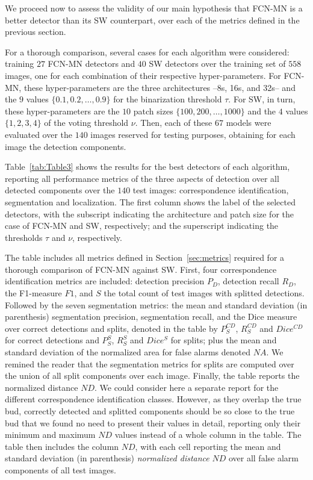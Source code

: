 \documentclass[a4paper,authoryear,review]{elsarticle}
\begin{document}
	We proceed now to assess the validity of our main hypothesis that FCN-MN is a better detector than its SW counterpart, over each of the metrics defined in the previous section. 
	
	For a thorough comparison, several cases for each algorithm  were considered: training $27$ FCN-MN detectors and $40$ SW detectors over the training set of $558$ images, one for each combination of their respective hyper-parameters. For FCN-MN, these hyper-parameters are the three architectures --8s, 16s, and 32s-- and the $9$ values $\{0.1, 0.2, \ldots, 0.9\}$ for the binarization threshold $\tau$. For SW, in turn, these hyper-parameters are the $10$ patch sizes $\{100, 200, \ldots, 1000\}$  and the $4$ values $\{1, 2, 3, 4\}$ of the voting threshold $\nu$. Then, each of these $67$ models were evaluated over the $140$ images reserved for testing purposes, obtaining for each image the detection components.
	
	Table~\ref{tab:Table3} shows the results for the best detectors of each algorithm, reporting all performance metrics of the three aspects of detection over all detected components over the $140$ test images: correspondence identification, segmentation and localization. The first column shows the label of the selected detectors, with the subscript indicating the architecture and patch size for the case of FCN-MN and SW, respectively; and the superscript indicating the thresholds $\tau$ and $\nu$, respectively.
	
	The table includes all metrics defined in Section~\ref{sec:metrics} required for a thorough comparison of FCN-MN against SW. First, four correspondence identification metrics are included: detection precision $P_D$, detection recall $R_D$, the F1-measure  $F1$, and $S$ the total count of test images with splitted detections. Followed by the seven segmentation metrics: the mean and standard deviation (in parenthesis) segmentation precision, segmentation recall, and the Dice measure over correct detections and splits, denoted in the table by $P_S^{CD}$, $R_S^{CD}$ and $Dice^{CD}$ for correct detections and $P_S^S$, $R_S^S$ and $Dice^S$ for splits; plus the mean and standard deviation of the normalized area for false alarms denoted $NA$. We remined the reader that the segmentation metrics for splits are computed over the union of all split components over each image. 
	Finally, the table reports the normalized distance $ND$. We could consider here a separate report for the different correspondence identification classes. However, as they overlap the true bud, correctly detected and splitted components should be so close to the true bud that we found no need to present their values in detail, reporting only their minimum and maximum $ND$ values instead of a whole column in the table. The table then includes the column $ND$, with each cell reporting the mean and standard deviation (in parenthesis) \emph{normalized distance} $ND$ over all false alarm components of all test images. 
	
\end{document}
